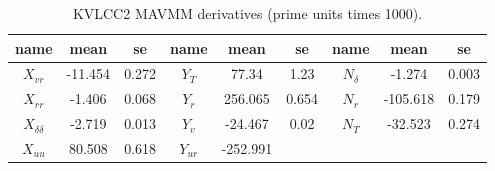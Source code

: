\begin{table}[!htb]
    \footnotesize
    \centering
        \caption{KVLCC2 MAVMM derivatives (prime units times 1000).}
    \label{\detokenize{06.20_results_kvlcc2:kvlcc2-derivatives}}
    \begin{tabular}{|c|c|c|c|c|c|c|c|c|}
\hline


name
&

mean
&

se
&

name
&

mean
&

se
&

name
&

mean
&

se
\\
\hline

\( X_{vr} \)
&

-11.454
&

0.272
&

\( Y_{T} \)
&

77.34
&

1.23
&

\( N_{\delta} \)
&

-1.274
&

0.003
\\


\( X_{rr} \)
&

-1.406
&

0.068
&

\( Y_{r} \)
&

256.065
&

0.654
&

\( N_{r} \)
&

-105.618
&

0.179
\\


\( X_{\delta\delta} \)
&

-2.719
&

0.013
&

\( Y_{v} \)
&

-24.467
&

0.02
&

\( N_{T} \)
&

-32.523
&

0.274
\\


\( X_{uu} \)
&

80.508
&

0.618
&

\( Y_{ur} \)
&

-252.991
&


\end{tabular}
\end{table}
